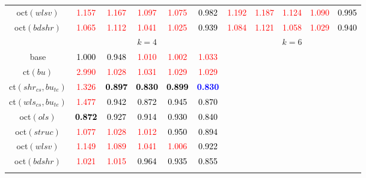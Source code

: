\begin{tabular}[t]{c|>{}cccc>{}c|ccccc}
oct$(wlsv)$ & \textcolor{red}{1.157} & \textcolor{red}{1.167} & \textcolor{red}{1.097} & \textcolor{red}{1.075} & \textcolor{black}{0.982} & \textcolor{red}{1.192} & \textcolor{red}{1.187} & \textcolor{red}{1.124} & \textcolor{red}{1.090} & \textcolor{black}{0.995}\\
oct$(bdshr)$ & \textcolor{red}{1.065} & \textcolor{red}{1.112} & \textcolor{red}{1.041} & \textcolor{red}{1.025} & \textcolor{black}{0.939} & \textcolor{red}{1.084} & \textcolor{red}{1.121} & \textcolor{red}{1.058} & \textcolor{red}{1.029} & \textcolor{black}{0.940}\\
\addlinespace[0.3em]
 &  & \\
base & \textcolor{black}{1.000} & \textcolor{black}{0.948} & \textcolor{red}{1.010} & \textcolor{red}{1.002} & \textcolor{red}{1.033} &  &  &  &  & \\
ct$(bu)$ & \textcolor{red}{2.990} & \textcolor{red}{1.028} & \textcolor{red}{1.031} & \textcolor{red}{1.029} & \textcolor{red}{1.029} &  &  &  &  & \\
ct$(shr_{cs}, bu_{te})$ & \textcolor{red}{1.326} & \textcolor{black}{\textbf{0.897}} & \textcolor{black}{\textbf{0.830}} & \textcolor{black}{\textbf{0.899}} & \textcolor{blue}{\textbf{0.830}} &  &  &  &  & \\
ct$(wls_{cs}, bu_{te})$ & \textcolor{red}{1.477} & \textcolor{black}{0.942} & \textcolor{black}{0.872} & \textcolor{black}{0.945} & \textcolor{black}{0.870} &  &  &  &  & \\
oct$(ols)$ & \textcolor{black}{\textbf{0.872}} & \textcolor{black}{0.927} & \textcolor{black}{0.914} & \textcolor{black}{0.930} & \textcolor{black}{0.840} &  &  &  &  & \\
oct$(struc)$ & \textcolor{red}{1.077} & \textcolor{red}{1.028} & \textcolor{red}{1.012} & \textcolor{black}{0.950} & \textcolor{black}{0.894} &  &  &  &  & \\
oct$(wlsv)$ & \textcolor{red}{1.149} & \textcolor{red}{1.089} & \textcolor{red}{1.041} & \textcolor{red}{1.006} & \textcolor{black}{0.922} &  &  &  &  & \\
oct$(bdshr)$ & \textcolor{red}{1.021} & \textcolor{red}{1.015} & \textcolor{black}{0.964} & \textcolor{black}{0.935} & \textcolor{black}{0.855} &  &  &  &  & \\
\bottomrule
{}\\
\end{tabular}
